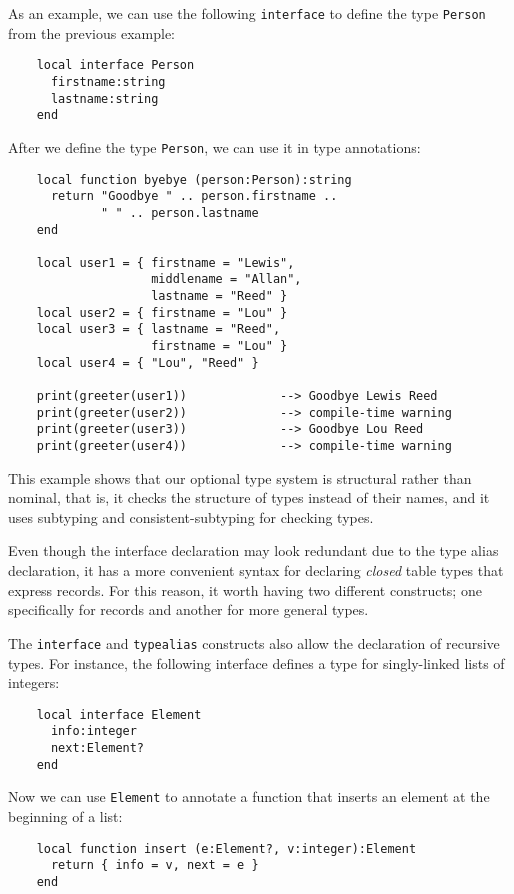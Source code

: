 As an example, we can use the following \texttt{interface} to
define the type \texttt{Person} from the previous example:
\begin{verbatim}
    local interface Person
      firstname:string
      lastname:string
    end
\end{verbatim}

After we define the type \texttt{Person}, we can use it in type annotations:
\begin{verbatim}
    local function byebye (person:Person):string
      return "Goodbye " .. person.firstname ..
             " " .. person.lastname
    end

    local user1 = { firstname = "Lewis",
                    middlename = "Allan",
                    lastname = "Reed" }
    local user2 = { firstname = "Lou" }
    local user3 = { lastname = "Reed",
                    firstname = "Lou" }
    local user4 = { "Lou", "Reed" }

    print(greeter(user1))             --> Goodbye Lewis Reed 
    print(greeter(user2))             --> compile-time warning
    print(greeter(user3))             --> Goodbye Lou Reed
    print(greeter(user4))             --> compile-time warning
\end{verbatim}

This example shows that our optional type system is structural rather
than nominal, that is, it checks the structure of types instead of
their names, and it uses subtyping and consistent-subtyping for
checking types.

Even though the interface declaration may look redundant due to
the type alias declaration, it has a more convenient syntax
for declaring \emph{closed} table types that express records.
For this reason, it worth having two different constructs;
one specifically for records and another for more general types.

The \texttt{interface} and \texttt{typealias} constructs also allow
the declaration of recursive types.
For instance, the following interface defines a type for singly-linked
lists of integers:
\begin{verbatim}
    local interface Element
      info:integer
      next:Element?
    end
\end{verbatim}

Now we can use \texttt{Element} to annotate a function that
inserts an element at the beginning of a list:
\begin{verbatim}
    local function insert (e:Element?, v:integer):Element 
      return { info = v, next = e }
    end
\end{verbatim}


